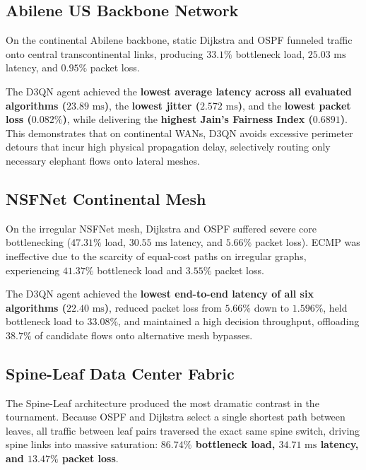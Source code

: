 \subsection{Abilene US Backbone Network}
On the continental Abilene backbone, static Dijkstra and OSPF funneled traffic onto central transcontinental links, producing $33.1\%$ bottleneck load, $25.03\text{ ms}$ latency, and $0.95\%$ packet loss. 

The D3QN agent achieved the \textbf{lowest average latency across all evaluated algorithms ($23.89\text{ ms}$)}, the \textbf{lowest jitter ($2.572\text{ ms}$)}, and the \textbf{lowest packet loss ($0.082\%$)}, while delivering the \textbf{highest Jain's Fairness Index ($0.6891$)}. This demonstrates that on continental WANs, D3QN avoids excessive perimeter detours that incur high physical propagation delay, selectively routing only necessary elephant flows onto lateral meshes.

\subsection{NSFNet Continental Mesh}
On the irregular NSFNet mesh, Dijkstra and OSPF suffered severe core bottlenecking ($47.31\%$ load, $30.55\text{ ms}$ latency, and $5.66\%$ packet loss). ECMP was ineffective due to the scarcity of equal-cost paths on irregular graphs, experiencing $41.37\%$ bottleneck load and $3.55\%$ packet loss.

The D3QN agent achieved the \textbf{lowest end-to-end latency of all six algorithms ($22.40\text{ ms}$)}, reduced packet loss from $5.66\%$ down to \textbf{$1.596\%$}, held bottleneck load to \textbf{$33.08\%$}, and maintained a high decision throughput, offloading $38.7\%$ of candidate flows onto alternative mesh bypasses.

\subsection{Spine-Leaf Data Center Fabric}
The Spine-Leaf architecture produced the most dramatic contrast in the tournament. Because OSPF and Dijkstra select a single shortest path between leaves, all traffic between leaf pairs traversed the exact same spine switch, driving spine links into massive saturation: \textbf{$86.74\%$ bottleneck load, $34.71\text{ ms}$ latency, and $13.47\%$ packet loss}.

